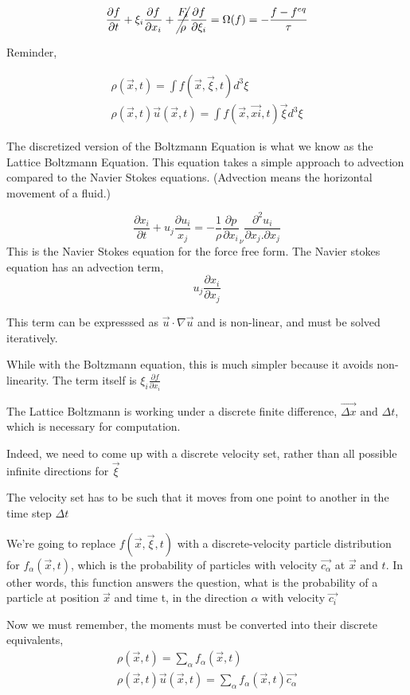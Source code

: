 \documentclass{article}
\begin{document}
$$\frac{\partial f}{\partial t} + \xi_i \frac{\partial f}{\partial x_i} + \cancel{\frac{F_i}{\rho}}\frac{\partial f}{\partial \xi_i} = \Omega(f) = - \frac{f - f^{eq}}{\tau}$$

Reminder,

\begin{align*}
	\rho(\vec{x},t) = \int f(\vec{x},\vec{\xi},t) d^3 \xi\\
	\rho(\vec{x},t)\vec{u}(\vec{x},t) = \int f(\vec{x},\vec{xi},t)\vec{\xi} d^3 \xi
\end{align*}

The discretized version of the Boltzmann Equation is what we know as the Lattice Boltzmann Equation. This equation takes a simple approach to advection compared to the Navier Stokes equations. (Advection means the horizontal movement of a fluid.)

\[
	\frac{\partial x_i}{\partial t} + u_j \frac{\partial u_i}{x_j} = -\frac{1}{\rho} \frac{\partial p}{\partial x_i} _ \nu \frac{\partial^2 u_i}{\partial x_j. \partial x_j}
\]
This is the Navier Stokes equation for the force free form. The Navier stokes equation has an advection term,
\[
	u_j \frac{\partial x_i}{\partial x_j}
\]

This term can be expresssed as $\vec{u} \cdot \nabla \vec{u}$ and is non-linear, and must be solved iteratively.

While with the Boltzmann equation, this is much simpler because it avoids non-linearity. The term itself is $\xi_i \frac{\partial f}{\partial x_i}$

The Lattice Boltzmann is working under a discrete finite difference, $\vec{\Delta x} \text{ and } \Delta t$, which is necessary for computation.

Indeed, we need to come up with a discrete velocity set, rather than all possible infinite directions for $\vec{\xi}$

The velocity set has to be such that it moves from one point to another in the time step $\Delta t$

We're going to replace $f(\vec{x},\vec{\xi},t)$ with a discrete-velocity particle distribution for $f_\alpha (\vec{x},t)$, which is the probability of particles with velocity $\vec{c_\alpha}$ at $\vec{x} \text{ and } t$. In other words, this function answers the question, what is the probability of a particle at position $\vec{x}$ and time t, in the direction $\alpha$ with velocity $\vec{c_i}$

Now we must remember, the moments must be converted into their discrete equivalents,
\begin{align*}
	\rho(\vec{x},t) = \sum_\alpha f_{\alpha} (\vec{x},t) \\
	\rho(\vec{x},t) \vec{u}(\vec{x},t) = \sum_\alpha f_\alpha(\vec{x},t) \vec{c_\alpha}
\end{align*}
\end{document}
